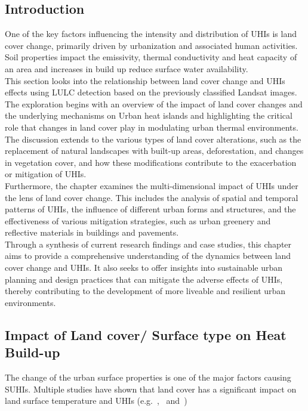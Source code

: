 \documentclass[12pt,a4paper, english,twoside]{article}
\begin{document}
    \subsection{Introduction}
      One of the key factors influencing the intensity and distribution of \glspl{UHI} is land cover change, primarily driven by urbanization and associated human activities.
      Soil properties impact the emissivity, thermal conductivity and heat capacity of an area and increases in build up reduce surface water availability. 
      \\    
      This section looks into the relationship between land cover change and \glspl{UHI} effects using \gls{LULC} detection based on the previously classified Landsat images.
      The exploration begins with an overview of the impact of land cover changes and the underlying mechanisms on Urban heat islands and highlighting the critical role that changes in land cover play in modulating urban thermal environments.
      The discussion extends to the various types of land cover alterations, such as the replacement of natural landscapes with built-up areas, deforestation, and changes in vegetation cover, and how these modifications contribute to the exacerbation or mitigation of \glspl{UHI}.
      \\
      Furthermore, the chapter examines the multi-dimensional impact of \glspl{UHI} under the lens of land cover change.
      This includes the analysis of spatial and temporal patterns of \glspl{UHI}, the influence of different urban forms and structures, and the effectiveness of various mitigation strategies, such as urban greenery and reflective materials in buildings and pavements.
      \\
      Through a synthesis of current research findings and case studies, this chapter aims to provide a comprehensive understanding of the dynamics between land cover change and \glspl{UHI}.
      It also seeks to offer insights into sustainable urban planning and design practices that can mitigate the adverse effects of \glspl{UHI}, thereby contributing to the development of more liveable and resilient urban environments.
%
    \subsection{Impact of Land cover/ Surface type on Heat Build-up}
      The change of the urban surface properties is one of the major factors causing \glspl{SUHI}.  
      Multiple studies have shown that land cover has a significant impact on land surface temperature and \glspl{UHI} (e.g.~\autocite{Karakus2019},~\cite{Weng2004} and~\cite{Stewart2011})
\end{document}
